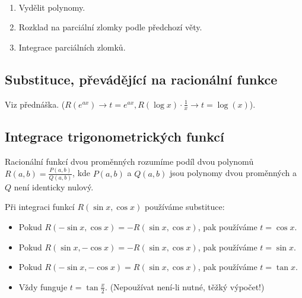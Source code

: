 \documentclass[12pt]{article}                   %
\begin{document}
        \begin{poznamka}
            \ 
            \begin{enumerate}
                \item Vydělit polynomy.
                \item Rozklad na parciální zlomky podle předchozí věty.
                \item Integrace parciálních zlomků.
            \end{enumerate}
        \end{poznamka}


    \subsection{Substituce, převádějící na racionální funkce}
        Viz přednáška. ($R(e^{ax}) \rightarrow t = e^{ax}, R(\log x)·\frac{1}{x} \rightarrow t = \log(x)$).

    \subsection{Integrace trigonometrických funkcí}
        \begin{definice}
            Racionální funkcí dvou proměnných rozumíme podíl dvou polynomů $R(a, b) = \frac{P(a, b)}{Q(a, b)}$, kde $P(a, b)$ a $Q(a, b)$ jsou polynomy dvou proměnných a $Q$ není identicky nulový.
        \end{definice}

        \begin{poznamka}
            Při integraci funkcí $R(\sin x, \cos x)$ používáme substituce:

            \begin{itemize}
                \item Pokud $R(-\sin x, \cos x) = -R(\sin x, \cos x)$, pak používáme $t = \cos x$.
                \item Pokud $R(\sin x, -\cos x) = -R(\sin x, \cos x)$, pak používáme $t = \sin x$.
                \item Pokud $R(-\sin x, -\cos x) = R(\sin x, \cos x)$, pak používáme $t = \tan x$.
                \item Vždy funguje $t = \tan \frac{x}{2}$. (Nepoužívat není-li nutné, těžký výpočet!)
            \end{itemize}
        \end{poznamka}
\end{document}
